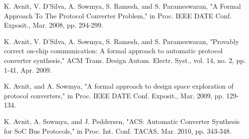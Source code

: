 \documentclass[journal]{IEEEtran}
\begin{document}
\begin{thebibliography}{1}
K. Avnit, V. D'Silva, A. Sowmya, S. Ramesh, and S. Parameswaran,
"A Formal Approach To The Protocol Converter Problem,"
in Proc. IEEE DATE Conf. Exposit., Mar. 2008, pp. 294-299.



K. Avnit, V. D'Silva, A. Sowmya, S. Ramesh, and S. Parameswaran,
"Provably correct on-chip communication: A formal approach to automatic protocol converter synthesis,"
ACM Trans. Design Autom. Electr. Syst.,
vol. 14, no. 2, pp. 1-41, Apr. 2009.



K. Avnit, and A. Sowmya,
"A formal approach to design space exploration of protocol converters,"
in Proc. IEEE DATE Conf. Exposit., Mar. 2009, pp. 129-134.



K. Avnit, A. Sowmya, and J. Peddersen,
"ACS: Automatic Converter Synthesis for SoC Bus Protocols,"
in Proc. Int. Conf. TACAS, Mar. 2010, pp. 343-348.


%





\end{thebibliography}

%



\end{document}
